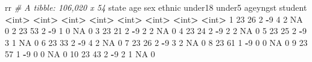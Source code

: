\documentclass[
]{book}
\newenvironment{Shaded}{\begin{snugshade}}{\end{snugshade}}
\newcommand{\CommentTok}[1]{\textcolor[rgb]{0.56,0.35,0.01}{\textit{#1}}}
\newcommand{\ConstantTok}[1]{\textcolor[rgb]{0.56,0.35,0.01}{#1}}
\newcommand{\DecValTok}[1]{\textcolor[rgb]{0.00,0.00,0.81}{#1}}
\newcommand{\ErrorTok}[1]{\textcolor[rgb]{0.64,0.00,0.00}{\textbf{#1}}}
\newcommand{\NormalTok}[1]{#1}
\newcommand{\SpecialCharTok}[1]{\textcolor[rgb]{0.81,0.36,0.00}{\textbf{#1}}}
\begin{document}
\begin{Shaded}
\begin{Highlighting}[]
\NormalTok{rr}
\CommentTok{\# A tibble: 106,020 x 54}
\NormalTok{   state   age   sex ethnic under18 under5 ageyngst student}
   \SpecialCharTok{\textless{}}\NormalTok{int}\SpecialCharTok{\textgreater{}} \ErrorTok{\textless{}}\NormalTok{int}\SpecialCharTok{\textgreater{}} \ErrorTok{\textless{}}\NormalTok{int}\SpecialCharTok{\textgreater{}}  \ErrorTok{\textless{}}\NormalTok{int}\SpecialCharTok{\textgreater{}}   \ErrorTok{\textless{}}\NormalTok{int}\SpecialCharTok{\textgreater{}}  \ErrorTok{\textless{}}\NormalTok{int}\SpecialCharTok{\textgreater{}}    \ErrorTok{\textless{}}\NormalTok{int}\SpecialCharTok{\textgreater{}}   \ErrorTok{\textless{}}\NormalTok{int}\SpecialCharTok{\textgreater{}}
 \DecValTok{1}    \DecValTok{23}    \DecValTok{26}     \DecValTok{2}     \SpecialCharTok{{-}}\DecValTok{9}       \DecValTok{4}      \DecValTok{2}       \ConstantTok{NA}       \DecValTok{0}
 \DecValTok{2}    \DecValTok{23}    \DecValTok{53}     \DecValTok{2}     \SpecialCharTok{{-}}\DecValTok{9}       \DecValTok{1}      \DecValTok{0}       \ConstantTok{NA}       \DecValTok{0}
 \DecValTok{3}    \DecValTok{23}    \DecValTok{21}     \DecValTok{2}     \SpecialCharTok{{-}}\DecValTok{9}       \DecValTok{2}      \DecValTok{2}       \ConstantTok{NA}       \DecValTok{0}
 \DecValTok{4}    \DecValTok{23}    \DecValTok{24}     \DecValTok{2}     \SpecialCharTok{{-}}\DecValTok{9}       \DecValTok{2}      \DecValTok{2}       \ConstantTok{NA}       \DecValTok{0}
 \DecValTok{5}    \DecValTok{23}    \DecValTok{25}     \DecValTok{2}     \SpecialCharTok{{-}}\DecValTok{9}       \DecValTok{3}      \DecValTok{1}       \ConstantTok{NA}       \DecValTok{0}
 \DecValTok{6}    \DecValTok{23}    \DecValTok{33}     \DecValTok{2}     \SpecialCharTok{{-}}\DecValTok{9}       \DecValTok{4}      \DecValTok{2}       \ConstantTok{NA}       \DecValTok{0}
 \DecValTok{7}    \DecValTok{23}    \DecValTok{26}     \DecValTok{2}     \SpecialCharTok{{-}}\DecValTok{9}       \DecValTok{3}      \DecValTok{2}       \ConstantTok{NA}       \DecValTok{0}
 \DecValTok{8}    \DecValTok{23}    \DecValTok{61}     \DecValTok{1}     \SpecialCharTok{{-}}\DecValTok{9}       \DecValTok{0}      \DecValTok{0}       \ConstantTok{NA}       \DecValTok{0}
 \DecValTok{9}    \DecValTok{23}    \DecValTok{57}     \DecValTok{1}     \SpecialCharTok{{-}}\DecValTok{9}       \DecValTok{0}      \DecValTok{0}       \ConstantTok{NA}       \DecValTok{0}
\DecValTok{10}    \DecValTok{23}    \DecValTok{43}     \DecValTok{2}     \SpecialCharTok{{-}}\DecValTok{9}       \DecValTok{2}      \DecValTok{1}       \ConstantTok{NA}       \DecValTok{0}

\end{Highlighting}
\end{Shaded}
\end{document}

